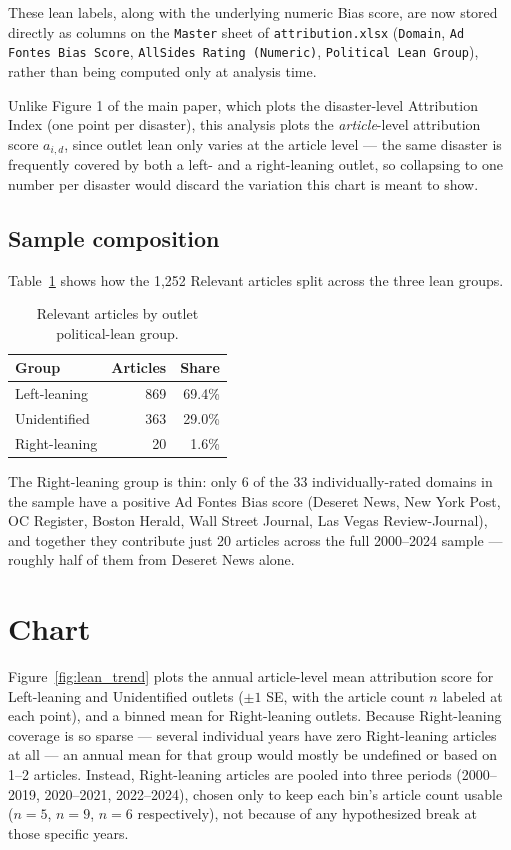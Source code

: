 \documentclass[12pt]{article}
\begin{document}
These lean labels, along with the underlying numeric Bias score, are
now stored directly as columns on the \texttt{Master} sheet of
\texttt{attribution.xlsx} (\texttt{Domain}, \texttt{Ad Fontes Bias
Score}, \texttt{AllSides Rating (Numeric)}, \texttt{Political Lean
Group}), rather than being computed only at analysis time.

Unlike Figure 1 of the main paper, which plots the disaster-level
Attribution Index (one point per disaster), this analysis plots the
\emph{article}-level attribution score $a_{i,d}$, since outlet lean
only varies at the article level --- the same disaster is frequently
covered by both a left- and a right-leaning outlet, so collapsing to
one number per disaster would discard the variation this chart is
meant to show.

\subsection*{Sample composition}

Table~\ref{tab:lean_counts} shows how the 1,252 Relevant articles
split across the three lean groups.

\begin{table}[h]
\centering
\begin{tabular}{lrr}
\toprule
Group & Articles & Share \\
\midrule
Left-leaning & 869 & 69.4\% \\
Unidentified & 363 & 29.0\% \\
Right-leaning & 20 & 1.6\% \\
\bottomrule
\end{tabular}
\caption{Relevant articles by outlet political-lean group.}
\label{tab:lean_counts}
\end{table}

The Right-leaning group is thin: only 6 of the 33 individually-rated
domains in the sample have a positive Ad Fontes Bias score (Deseret
News, New York Post, OC Register, Boston Herald, Wall Street Journal,
Las Vegas Review-Journal), and together they contribute just 20
articles across the full 2000--2024 sample --- roughly half of them
from Deseret News alone.

\FloatBarrier
\section*{Chart}

Figure~\ref{fig:lean_trend} plots the annual article-level mean
attribution score for Left-leaning and Unidentified outlets
($\pm 1$ SE, with the article count $n$ labeled at each point), and a
binned mean for Right-leaning outlets. Because Right-leaning coverage
is so sparse --- several individual years have zero Right-leaning
articles at all --- an annual mean for that group would mostly be
undefined or based on 1--2 articles. Instead, Right-leaning articles
are pooled into three periods (2000--2019, 2020--2021, 2022--2024),
chosen only to keep each bin's article count usable ($n=5$, $n=9$,
$n=6$ respectively), not because of any hypothesized break at those
specific years.
\end{document}
